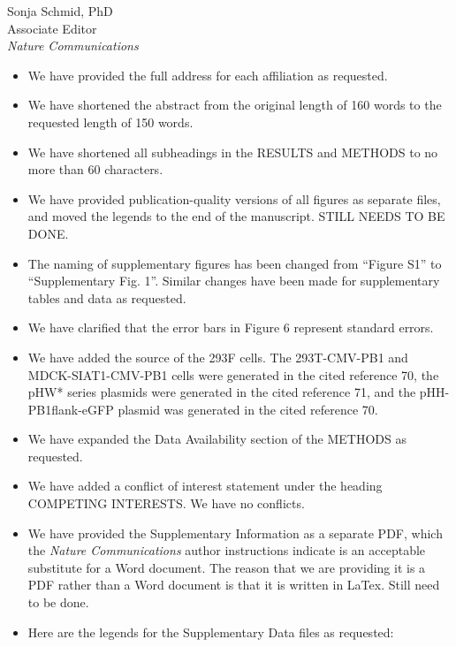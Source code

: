 \documentclass[a4paper,11pt]{letter}
\begin{document}
\begin{letter}{Sonja Schmid, PhD \\ Associate Editor \\ \textit{Nature Communications} }
\begin{itemize}
\item We have provided the full address for each affiliation as requested.

\item We have shortened the abstract from the original length of 160 words to the requested length of 150 words.

\item We have shortened all subheadings in the RESULTS and METHODS to no more than 60 characters.

\item We have provided publication-quality versions of all figures as separate files, and moved the legends to the end of the manuscript. {\color{red}STILL NEEDS TO BE DONE.}

\item The naming of supplementary figures has been changed from ``Figure S1'' to ``Supplementary Fig. 1''. Similar changes have been made for supplementary tables and data as requested.

\item We have clarified that the error bars in Figure 6 represent standard errors.

\item We have added the source of the 293F cells. The 293T-CMV-PB1 and MDCK-SIAT1-CMV-PB1 cells were generated in the cited reference 70, the pHW* series plasmids were generated in the cited reference 71, and the pHH-PB1flank-eGFP plasmid was generated in the cited reference 70.

\item We have expanded the Data Availability section of the METHODS as requested. 

\item We have added a conflict of interest statement under the heading COMPETING INTERESTS. We have no conflicts.

\item We have provided the Supplementary Information as a separate PDF, which the \textit{Nature Communications} author instructions indicate is an acceptable substitute for a Word document. The reason that we are providing it is a PDF rather than a Word document is that it is written in LaTex. {\color{red} Still need to be done.}

\item Here are the legends for the Supplementary Data files as requested:

\begin{itemize}


\end{itemize}
\end{itemize}
\end{letter}
\end{document}
